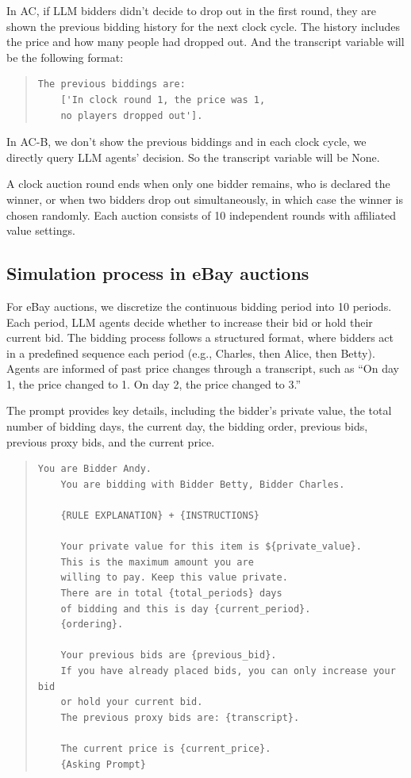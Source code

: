 \documentclass{article} %
\begin{document}
In AC, if LLM bidders didn't decide to drop out in the first round, they are shown the previous bidding history for the next clock cycle. The history includes the price and how many people had dropped out. 
And the transcript variable will be the following format:
\begin{quote}
\begin{lstlisting}[basicstyle=\ttfamily]
    The previous biddings are: 
    ['In clock round 1, the price was 1, 
    no players dropped out'].
\end{lstlisting}
\end{quote}

In AC-B, we don't show the previous biddings and in each clock cycle, we directly query LLM agents' decision. 
So the transcript variable will be None.

A clock auction round ends when only one bidder remains, who is declared the winner, or when two bidders drop out simultaneously, in which case the winner is chosen randomly. Each auction consists of 10 independent rounds with affiliated value settings.



\subsection{Simulation process in eBay auctions}\label{app:ebay}

For eBay auctions, we discretize the continuous bidding period into 10 periods. Each period, LLM agents decide whether to increase their bid or hold their current bid. The bidding process follows a structured format, where bidders act in a predefined sequence each period (e.g., Charles, then Alice, then Betty). Agents are informed of past price changes through a transcript, such as ``On day 1, the price changed to 1. On day 2, the price changed to 3.''

The prompt provides key details, including the bidder's private value, the total number of bidding days, the current day, the bidding order, previous bids, previous proxy bids, and the current price.
\begin{quote}
\begin{lstlisting}[basicstyle=\ttfamily]
    You are Bidder Andy.            
    You are bidding with Bidder Betty, Bidder Charles.     
    
    {RULE EXPLANATION} + {INSTRUCTIONS} 
    
    Your private value for this item is ${private_value}. 
    This is the maximum amount you are 
    willing to pay. Keep this value private.
    There are in total {total_periods} days
    of bidding and this is day {current_period}. 
    {ordering}.
    
    Your previous bids are {previous_bid}. 
    If you have already placed bids, you can only increase your bid 
    or hold your current bid.
    The previous proxy bids are: {transcript}.
    
    The current price is {current_price}.
    {Asking Prompt}
\end{lstlisting}
\end{quote}
\end{document}
